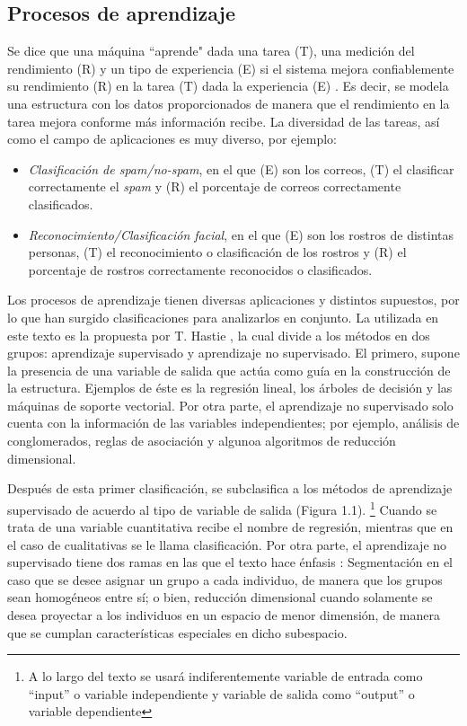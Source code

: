 \subsection{Procesos de aprendizaje}

Se dice que una máquina ``aprende" dada una tarea (T), una medición del rendimiento (R) y un tipo de experiencia (E) si el sistema mejora confiablemente su rendimiento (R) en la tarea (T) dada la experiencia (E) \cite{mitchell2006discipline}. Es decir, se modela una estructura con los datos proporcionados de manera que el rendimiento en la tarea mejora conforme más información recibe. La diversidad de las tareas, así como el campo de aplicaciones es muy diverso, por ejemplo:

\begin{itemize} 

\item \textit{Clasificación de spam/no-spam}, en el que (E) son los correos, (T) el clasificar correctamente el \textit{spam} y (R) el porcentaje de correos correctamente clasificados.

\item \textit{Reconocimiento/Clasificación facial}, en el que (E) son los rostros de distintas personas, (T) el reconocimiento o clasificación de los rostros y (R) el porcentaje de rostros correctamente reconocidos o clasificados.
\end{itemize} 

Los procesos de aprendizaje tienen diversas aplicaciones y distintos supuestos, por lo que han surgido clasificaciones para analizarlos en conjunto. La utilizada en este texto es la propuesta por T. Hastie \cite{hastie2009elements}, la cual divide a los métodos en dos grupos: aprendizaje supervisado y aprendizaje no supervisado. El primero, supone la presencia de una variable de salida que actúa como guía en la construcción de la estructura. Ejemplos de éste es la regresión lineal, los árboles de decisión y las máquinas de soporte vectorial. 
Por otra parte, el aprendizaje no supervisado solo cuenta con la información de las variables independientes; por ejemplo, análisis de conglomerados, reglas de asociación y algunoa algoritmos de reducción dimensional. 

Después de esta primer clasificación, se subclasifica a los métodos de aprendizaje supervisado de acuerdo al tipo de variable de salida (Figura 1.1). \footnote{A lo largo del texto se usará indiferentemente variable de entrada como ``input'' o variable independiente y variable de salida como ``output'' o variable dependiente} Cuando se trata de una variable cuantitativa recibe el nombre de regresión, mientras que en el caso de cualitativas se le llama clasificación. Por otra parte, el aprendizaje no supervisado tiene dos ramas en las que el texto hace énfasis \cite{hastie2009elements}: Segmentación en el caso que se desee asignar un grupo a cada individuo, de manera que los grupos sean homogéneos entre sí; o bien, reducción dimensional cuando solamente se desea proyectar a los individuos en un espacio de menor dimensión, de manera que se cumplan características especiales en dicho subespacio. 


